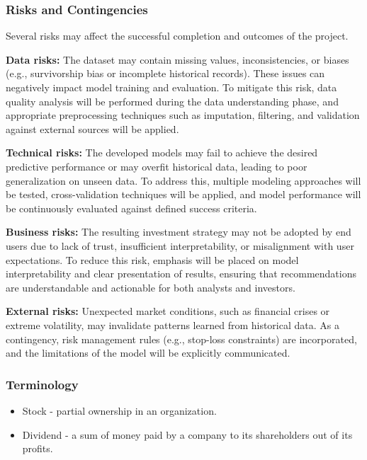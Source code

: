 \documentclass[oneside,final,12pt,a4paper]{extreport}
\begin{document}
\subsubsection{Risks and Contingencies}

Several risks may affect the successful completion and outcomes of the project.

\textbf{Data risks:} The dataset may contain missing values, inconsistencies, or biases (e.g., survivorship bias or incomplete historical records). These issues can negatively impact model training and evaluation. To mitigate this risk, data quality analysis will be performed during the data understanding phase, and appropriate preprocessing techniques such as imputation, filtering, and validation against external sources will be applied.

\textbf{Technical risks:} The developed models may fail to achieve the desired predictive performance or may overfit historical data, leading to poor generalization on unseen data. To address this, multiple modeling approaches will be tested, cross-validation techniques will be applied, and model performance will be continuously evaluated against defined success criteria.

\textbf{Business risks:} The resulting investment strategy may not be adopted by end users due to lack of trust, insufficient interpretability, or misalignment with user expectations. To reduce this risk, emphasis will be placed on model interpretability and clear presentation of results, ensuring that recommendations are understandable and actionable for both analysts and investors.

\textbf{External risks:} Unexpected market conditions, such as financial crises or extreme volatility, may invalidate patterns learned from historical data. As a contingency, risk management rules (e.g., stop-loss constraints) are incorporated, and the limitations of the model will be explicitly communicated.

\subsubsection{Terminology}
\begin{itemize}
    \item Stock - partial ownership in an organization.
    \item Dividend - a sum of money paid by a company to its shareholders out of its profits.
\end{itemize}
\end{document}
